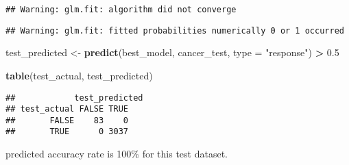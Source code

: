 \documentclass[]{article}
\newenvironment{Shaded}{\begin{snugshade}}{\end{snugshade}}
\newcommand{\DataTypeTok}[1]{\textcolor[rgb]{0.13,0.29,0.53}{#1}}
\newcommand{\FloatTok}[1]{\textcolor[rgb]{0.00,0.00,0.81}{#1}}
\newcommand{\KeywordTok}[1]{\textcolor[rgb]{0.13,0.29,0.53}{\textbf{#1}}}
\newcommand{\NormalTok}[1]{#1}
\newcommand{\OperatorTok}[1]{\textcolor[rgb]{0.81,0.36,0.00}{\textbf{#1}}}
\newcommand{\StringTok}[1]{\textcolor[rgb]{0.31,0.60,0.02}{#1}}
\begin{document}
\begin{verbatim}
## Warning: glm.fit: algorithm did not converge
\end{verbatim}

\begin{verbatim}
## Warning: glm.fit: fitted probabilities numerically 0 or 1 occurred
\end{verbatim}

\begin{Shaded}
\begin{Highlighting}[]
\NormalTok{test_predicted <-}\StringTok{ }\KeywordTok{predict}\NormalTok{(best_model, cancer_test, }\DataTypeTok{type =} \StringTok{"response"}\NormalTok{) }\OperatorTok{>}\StringTok{ }\FloatTok{0.5}

\KeywordTok{table}\NormalTok{(test_actual, test_predicted)}
\end{Highlighting}
\end{Shaded}

\begin{verbatim}
##            test_predicted
## test_actual FALSE TRUE
##       FALSE    83    0
##       TRUE      0 3037
\end{verbatim}

predicted accuracy rate is 100\% for this test dataset.
\end{document}
